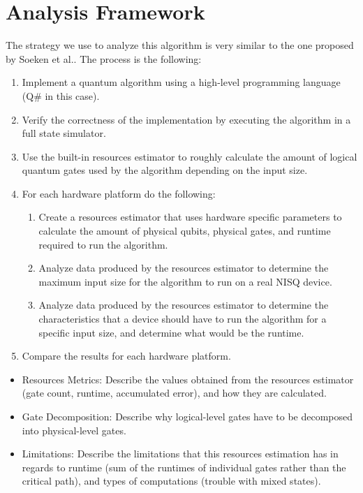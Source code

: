%
%
\chapter {Analysis Framework}

The strategy we use to analyze this algorithm is very similar to the one proposed by Soeken et al.\cite{ResourceEstimationFramework_Soeken_2021}. The process is the following:
\begin{enumerate}
    \item Implement a quantum algorithm using a high-level programming language (Q\# in this case).
    \item Verify the correctness of the implementation by executing the algorithm in a full state simulator.
    \item Use the built-in resources estimator to roughly calculate the amount of logical quantum gates used by the algorithm depending on the input size.
    \item For each hardware platform do the following:
    \begin{enumerate}
        \item Create a resources estimator that uses hardware specific parameters to calculate the amount of physical qubits, physical gates, and runtime required to run the algorithm.
        \item Analyze data produced by the resources estimator to determine the maximum input size for the algorithm to run on a real NISQ device.
        \item Analyze data produced by the resources estimator to determine the characteristics that a device should have to run the algorithm for a specific input size, and determine what would be the runtime.
    \end{enumerate}
    \item Compare the results for each hardware platform.
\end{enumerate}

\begin{itemize}
    \item Resources Metrics: Describe the values obtained from the resources estimator (gate count, runtime, accumulated error), and how they are calculated.
    \item Gate Decomposition: Describe why logical-level gates have to be decomposed into physical-level gates.
    \item Limitations: Describe the limitations that this resources estimation has in regards to runtime (sum of the runtimes of individual gates rather than the critical path), and types of computations (trouble with mixed states).
\end{itemize}

